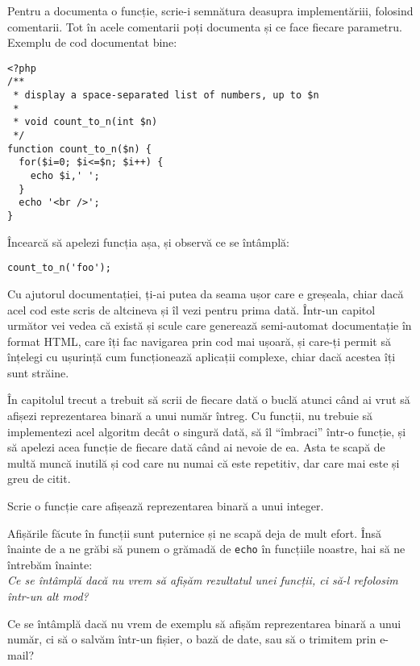 Pentru a documenta o funcție, scrie-i semnătura deasupra implementăriii,
folosind comentarii. Tot în acele comentarii poți documenta și
ce face fiecare parametru. Exemplu de cod documentat bine:

\begin{lstlisting}
<?php
/**
 * display a space-separated list of numbers, up to $n
 *
 * void count_to_n(int $n)
 */
function count_to_n($n) {
  for($i=0; $i<=$n; $i++) {
	echo $i,' ';
  }
  echo '<br />';
}
\end{lstlisting}

Încearcă să apelezi funcția așa, și observă
ce se întâmplă:
\begin{lstlisting}
count_to_n('foo');
\end{lstlisting}

Cu ajutorul documentației, ți-ai putea da seama ușor care e greșeala,
chiar dacă acel cod este scris de altcineva și îl vezi pentru prima dată.
Într-un capitol următor vei vedea că există și scule care generează semi-automat
documentație în format HTML, care îți fac navigarea prin cod mai ușoară, 
și care-ți permit să înțelegi cu ușurință cum funcționează aplicații
complexe, chiar dacă acestea îți sunt străine.

\begin{Exercise}[title={Funcție care afișează reprezentarea binară}]
În capitolul trecut a trebuit să scrii de fiecare
dată o buclă atunci când ai vrut să afișezi reprezentarea
binară a unui număr întreg. Cu funcții, nu trebuie
să implementezi acel algoritm decât o singură dată,
să îl ``îmbraci'' într-o funcție, și să apelezi acea
funcție de fiecare dată când ai nevoie de ea. Asta te scapă de
multă muncă inutilă și cod care nu numai că este repetitiv,
dar care mai este și greu de citit.

Scrie o funcție care afișează reprezentarea binară a unui integer.
\end{Exercise}

Afișările făcute în funcții sunt puternice și ne scapă deja de mult
efort. Însă înainte de a ne grăbi să punem o grămadă de \texttt{echo}
în funcțiile noastre, hai să ne întrebăm înainte:\\
\textit{Ce se întâmplă dacă nu vrem să afișăm rezultatul unei funcții, ci să-l
refolosim într-un alt mod?}

Ce se întâmplă dacă nu vrem de exemplu să afișăm reprezentarea binară
a unui număr, ci să o salvăm într-un fișier, o bază de date, sau să
o trimitem prin e-mail?

